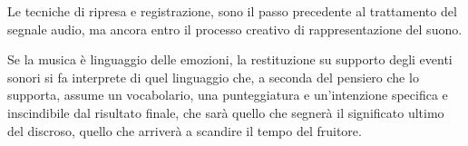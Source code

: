   Le tecniche di ripresa e registrazione, sono il passo precedente al trattamento del 
  segnale audio, ma ancora entro il processo creativo di rappresentazione del suono.
  
  Se la musica è linguaggio delle emozioni, la restituzione su supporto degli eventi
  sonori si fa interprete di quel linguaggio che, a seconda del pensiero che lo supporta, 
 assume un vocabolario, una punteggiatura e un'intenzione specifica e inscindibile dal 
 risultato finale, che sarà quello che segnerà il significato ultimo del discroso, quello che 
 arriverà a scandire il tempo del fruitore.
\vfill\null



%
%





%

%

